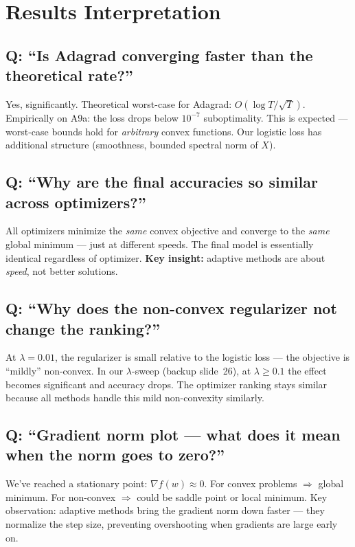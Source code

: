 \documentclass[10pt,a4paper]{article}
\begin{document}
\section{Results Interpretation}

\subsection{Q: ``Is Adagrad converging faster than the theoretical rate?''}
Yes, significantly.
Theoretical worst-case for Adagrad: $O(\log T / \sqrt{T})$.
Empirically on A9a: the loss drops below $10^{-7}$ suboptimality.
This is expected --- worst-case bounds hold for \emph{arbitrary} convex functions.
Our logistic loss has additional structure (smoothness, bounded spectral norm of $X$).

\subsection{Q: ``Why are the final accuracies so similar across optimizers?''}
All optimizers minimize the \emph{same} convex objective and converge to the \emph{same} global minimum --- just at different speeds.
The final model is essentially identical regardless of optimizer.
\textbf{Key insight:} adaptive methods are about \emph{speed}, not better solutions.

\subsection{Q: ``Why does the non-convex regularizer not change the ranking?''}
At $\lambda = 0.01$, the regularizer is small relative to the logistic loss --- the objective is ``mildly'' non-convex.
In our $\lambda$-sweep (backup slide~26), at $\lambda \geq 0.1$ the effect becomes significant and accuracy drops.
The optimizer ranking stays similar because all methods handle this mild non-convexity similarly.

\subsection{Q: ``Gradient norm plot --- what does it mean when the norm goes to zero?''}
We've reached a stationary point: $\nabla f(w) \approx 0$.
For convex problems $\Rightarrow$ global minimum.
For non-convex $\Rightarrow$ could be saddle point or local minimum.
Key observation: adaptive methods bring the gradient norm down faster --- they normalize the step size, preventing overshooting when gradients are large early on.
\end{document}
